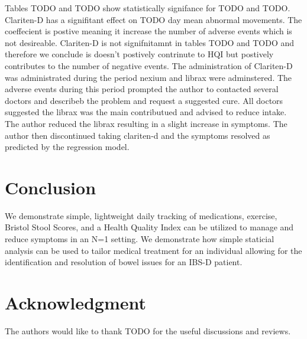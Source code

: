 \documentclass[conference]{IEEEtran}
\begin{document}
Tables TODO and TODO show statistically signifance for TODO and TODO.  Clariten-D has a signifitant effect on TODO day mean abnormal movements.  The coeffecient is postive meaning it increase the number of adverse events which is not desireable.  Clariten-D is not signifnitamnt in tables TODO and TODO and therefore we conclude is doesn't postively contrinute to HQI but postively contributes to the number of negative events.  The administration of Clariten-D was administrated during the period nexium and librax were adminstered.  The adverse events during this period prompted the author to contacted several doctors and describeb the problem and request a suggested cure.  All doctors suggested the librax was the main contributued and advised to reduce intake.  The author reduced the librax resulting in a slight increase in symptoms. The author then discontinued taking clariten-d and the symptoms resolved as predicted by the regression model.

\section*{Conclusion}
We demonstrate simple, lightweight daily tracking of medications, exercise, Bristol Stool Scores, and a Health Quality Index can be utilized to manage and reduce symptoms in an N=1 setting.  We demonstrate how simple staticial analysis can be used to tailor medical treatment for an individual allowing for the identification and resolution of bowel issues for an IBS-D patient.

\section*{Acknowledgment}
The authors would like to thank TODO for the useful discussions and reviews.






%
%
%




\end{document}
